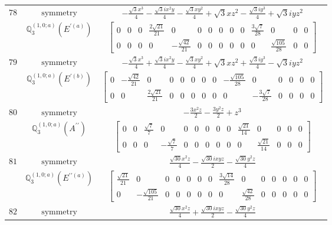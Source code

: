 \documentclass[fleqn,8pt,landscape]{jsarticle}
\begin{document}
\begin{longtable}{ccc}
$ 78 $ & $ \text{symmetry} $ & $ - \frac{\sqrt{3} x^{3}}{4} - \frac{\sqrt{3} i x^{2} y}{4} - \frac{\sqrt{3} x y^{2}}{4} + \sqrt{3} x z^{2} - \frac{\sqrt{3} i y^{3}}{4} + \sqrt{3} i y z^{2} $ \\
$  $ & $ \mathbb{Q}_{3}^{(1,0;a)}(E^{\prime(a)}) $ & $ \begin{bmatrix} 0 & 0 & 0 & \frac{2 \sqrt{21}}{21} & 0 & 0 & 0 & 0 & 0 & 0 & \frac{3 \sqrt{7}}{28} & 0 & 0 & 0 \\ 0 & 0 & 0 & 0 & - \frac{\sqrt{42}}{21} & 0 & 0 & 0 & 0 & 0 & 0 & \frac{\sqrt{105}}{28} & 0 & 0 \end{bmatrix} $ \\ \hline
$ 79 $ & $ \text{symmetry} $ & $ - \frac{\sqrt{3} x^{3}}{4} + \frac{\sqrt{3} i x^{2} y}{4} - \frac{\sqrt{3} x y^{2}}{4} + \sqrt{3} x z^{2} + \frac{\sqrt{3} i y^{3}}{4} - \sqrt{3} i y z^{2} $ \\
$  $ & $ \mathbb{Q}_{3}^{(1,0;a)}(E^{\prime(b)}) $ & $ \begin{bmatrix} 0 & - \frac{\sqrt{42}}{21} & 0 & 0 & 0 & 0 & 0 & 0 & - \frac{\sqrt{105}}{28} & 0 & 0 & 0 & 0 & 0 \\ 0 & 0 & \frac{2 \sqrt{21}}{21} & 0 & 0 & 0 & 0 & 0 & 0 & - \frac{3 \sqrt{7}}{28} & 0 & 0 & 0 & 0 \end{bmatrix} $ \\ \hline
$ 80 $ & $ \text{symmetry} $ & $ - \frac{3 x^{2} z}{2} - \frac{3 y^{2} z}{2} + z^{3} $ \\
$  $ & $ \mathbb{Q}_{3}^{(1,0;a)}(A^{\prime\prime}) $ & $ \begin{bmatrix} 0 & 0 & \frac{\sqrt{7}}{7} & 0 & 0 & 0 & 0 & 0 & 0 & \frac{\sqrt{21}}{14} & 0 & 0 & 0 & 0 \\ 0 & 0 & 0 & - \frac{\sqrt{7}}{7} & 0 & 0 & 0 & 0 & 0 & 0 & \frac{\sqrt{21}}{14} & 0 & 0 & 0 \end{bmatrix} $ \\ \hline
$ 81 $ & $ \text{symmetry} $ & $ \frac{\sqrt{30} x^{2} z}{4} - \frac{\sqrt{30} i x y z}{2} - \frac{\sqrt{30} y^{2} z}{4} $ \\
$  $ & $ \mathbb{Q}_{3}^{(1,0;a)}(E^{\prime\prime(a)}) $ & $ \begin{bmatrix} \frac{\sqrt{21}}{21} & 0 & 0 & 0 & 0 & 0 & 0 & \frac{3 \sqrt{14}}{28} & 0 & 0 & 0 & 0 & 0 & 0 \\ 0 & - \frac{\sqrt{105}}{21} & 0 & 0 & 0 & 0 & 0 & 0 & \frac{\sqrt{42}}{28} & 0 & 0 & 0 & 0 & 0 \end{bmatrix} $ \\ \hline
$ 82 $ & $ \text{symmetry} $ & $ \frac{\sqrt{30} x^{2} z}{4} + \frac{\sqrt{30} i x y z}{2} - \frac{\sqrt{30} y^{2} z}{4} $ \\

\end{longtable}
\end{document}
